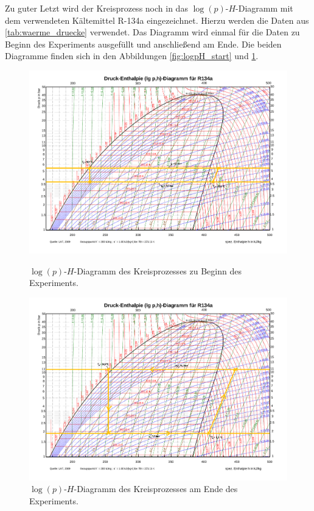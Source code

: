 \documentclass[english, ngerman]{scrartcl}
\begin{document}
%
Zu guter Letzt wird der Kreisprozess noch in das $\log(p)$-$H$-Diagramm mit dem verwendeten Kältemittel R-134a eingezeichnet. Hierzu werden die Daten aus \autoref{tab:waerme_druecke} verwendet. Das Diagramm wird einmal für die Daten zu Beginn des Experiments ausgefüllt und anschließend am Ende. Die beiden Diagramme finden sich in den Abbildungen \ref{fig:logpH_start} und \ref{fig:logpH_end}.
%
\setcapindent{0pt}
\begin{figure}[H]
    \centering
    \begin{minipage}[t]{0.475\linewidth}
        \centering
        \includegraphics[width=\linewidth]{fig/plots/logp-H-Diagramm_R134a_start.pdf}
        \caption[$\log(p)$-$H$-Diagramm Anfang]{$\log(p)$-$H$-Diagramm des Kreisprozesses zu Beginn des Experiments.}
        \label{fig:logpH_start}
    \end{minipage}%
    \hspace*{\fill}
    \begin{minipage}[t]{0.475\linewidth}
        \centering
        \includegraphics[width=\linewidth]{fig/plots/logp-H-Diagramm_R134a_end.pdf}
        \caption[$\log(p)$-$H$-Diagramm Ende]{$\log(p)$-$H$-Diagramm des Kreisprozesses am Ende des Experiments.}
        \label{fig:logpH_end}
    \end{minipage}
\end{figure}
\setcaphanging
\end{document}
